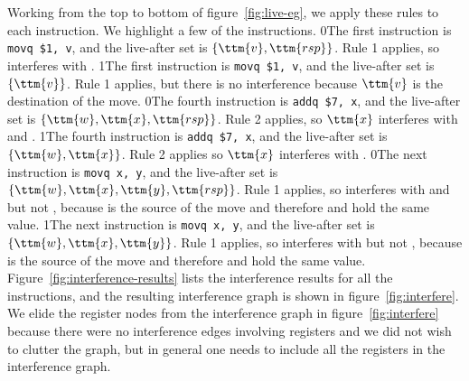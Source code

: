 \documentclass[7x10]{TimesAPriori_MIT}%
\def\racketEd{0}
\def\pythonEd{1}
\def\edition{1}
\newcommand{\racket}[1]{{\if\edition\racketEd{#1}\fi}}
\newcommand{\pythonColor}[0]{}
\newcommand{\python}[1]{{\if\edition\pythonEd\pythonColor #1\fi}}
\numberwithin{theorem}{chapter}
\numberwithin{definition}{chapter}
\numberwithin{equation}{chapter}
\begin{document}
Working from the top to bottom of figure~\ref{fig:live-eg}, we apply
these rules to each instruction. We highlight a few of the
instructions.  \racket{The first instruction is \lstinline{movq $1, v},
  and the live-after set is $\{\ttm{v},\ttm{rsp}\}$. Rule 1 applies,
  so \code{v} interferes with \code{rsp}.}
%
\python{The first instruction is \lstinline{movq $1, v}, and the
  live-after set is $\{\ttm{v}\}$. Rule 1 applies, but there is
  no interference because $\ttm{v}$ is the destination of the move.}
%
\racket{The fourth instruction is \lstinline{addq $7, x}, and the
  live-after set is $\{\ttm{w},\ttm{x},\ttm{rsp}\}$. Rule 2 applies, so
  $\ttm{x}$ interferes with  and \ttm{rsp}.}
%
\python{The fourth instruction is \lstinline{addq $7, x}, and the
  live-after set is $\{\ttm{w},\ttm{x}\}$. Rule 2 applies so
  $$ interferes with .}
%
\racket{The next instruction is \lstinline{movq x, y}, and the
  live-after set is $\{\ttm{w},\ttm{x},\ttm{y},\ttm{rsp}\}$. Rule 1
  applies, so \ttm{y} interferes with \ttm{w} and \ttm{rsp} but not
  \ttm{x}, because \ttm{x} is the source of the move and therefore
   and  hold the same value.}
%
\python{The next instruction is \lstinline{movq x, y}, and the
  live-after set is $\{\ttm{w},\ttm{x},\ttm{y}\}$. Rule 1
  applies, so \ttm{y} interferes with \ttm{w} but not
  \ttm{x}, because \ttm{x} is the source of the move and therefore
  \ttm{x} and \ttm{y} hold the same value.}
%
Figure~\ref{fig:interference-results} lists the interference results
for all the instructions, and the resulting interference graph is
shown in figure~\ref{fig:interfere}. We elide the register nodes from
the interference graph in figure~\ref{fig:interfere} because there
were no interference edges involving registers and we did not wish to
clutter the graph, but in general one needs to include all the
registers in the interference graph.
\end{document}
